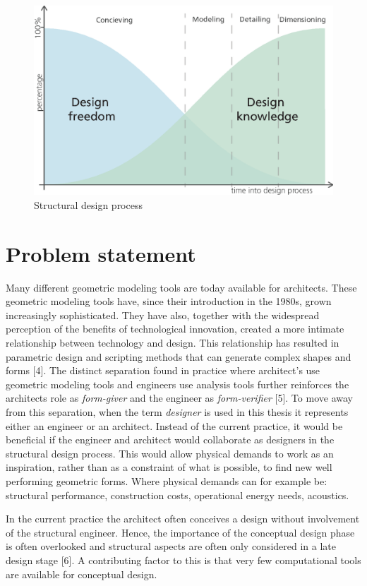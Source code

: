\begin{figure}
  \includegraphics[width=350pt]{graphics/freedom-vs-knowledge.eps}
  \caption{Structural design process \cite{Mueller2014}}
  \label{fig:freedom-vs-knowledge}
\end{figure}

\section{Problem statement}
Many different geometric modeling tools are today available for architects. These geometric modeling tools have, since their introduction in the 1980s, grown increasingly sophisticated. They have also, together with the widespread perception of the benefits of technological innovation, created a more intimate relationship between technology and design. This relationship has resulted in parametric design and scripting methods that can generate complex shapes and forms [4]. The distinct separation found in practice where architect’s use geometric modeling tools and engineers use analysis tools further reinforces the architects role as \textit{form-giver }and the engineer as \textit{form-verifier }[5]. To move away from this separation, when the term \textit{designer }is used in this thesis it represents either an engineer or an architect. Instead of the current practice, it would be beneficial if the engineer and architect would collaborate as designers in the structural design process. This would allow physical demands to work as an inspiration, rather than as a constraint of what is possible, to find new well performing geometric forms. Where physical demands can for example be: structural performance, construction costs, operational energy needs, acoustics.

In the current practice the architect often conceives a design without involvement of the structural engineer. Hence, the importance of the conceptual design phase is often overlooked and structural aspects are often only considered in a late design stage [6]. A contributing factor to this is that very few computational tools are available for conceptual design. 

